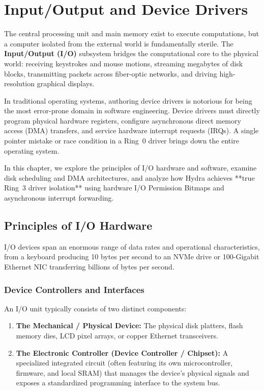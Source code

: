 \chapter{Input/Output and Device Drivers}
\label{chap:io}

The central processing unit and main memory exist to execute computations, but a computer isolated from the external world is fundamentally sterile. The \textbf{Input/Output (I/O)} subsystem bridges the computational core to the physical world: receiving keystrokes and mouse motions, streaming megabytes of disk blocks, transmitting packets across fiber-optic networks, and driving high-resolution graphical displays.

In traditional operating systems, authoring device drivers is notorious for being the most error-prone domain in software engineering. Device drivers must directly program physical hardware registers, configure asynchronous direct memory access (DMA) transfers, and service hardware interrupt requests (IRQs). A single pointer mistake or race condition in a Ring~0 driver brings down the entire operating system.

In this chapter, we explore the principles of I/O hardware and software, examine disk scheduling and DMA architectures, and analyze how Hydra achieves **true Ring~3 driver isolation** using hardware I/O Permission Bitmaps and asynchronous interrupt forwarding.

\section{Principles of I/O Hardware}
\label{sec:io_hardware}

I/O devices span an enormous range of data rates and operational characteristics, from a keyboard producing 10 bytes per second to an NVMe drive or 100-Gigabit Ethernet NIC transferring billions of bytes per second.

\subsection{Device Controllers and Interfaces}
An I/O unit typically consists of two distinct components:
\begin{enumerate}
    \item \textbf{The Mechanical / Physical Device:} The physical disk platters, flash memory dies, LCD pixel arrays, or copper Ethernet transceivers.
    \item \textbf{The Electronic Controller (Device Controller / Chipset):} A specialized integrated circuit (often featuring its own microcontroller, firmware, and local SRAM) that manages the device's physical signals and exposes a standardized programming interface to the system bus.
\end{enumerate}

